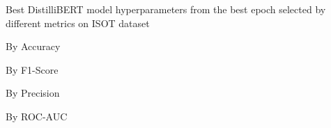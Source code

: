 \begin{table}[!htbp]
    \caption{Best DistilliBERT model hyperparameters from the best epoch selected by different metrics on ISOT dataset}
    \label{tab:isot_distillibert_hparams}
    \centering

    \begin{subtable}[t]{0.48\linewidth}
        \scriptsize
        \caption{By Accuracy}
        
    \end{subtable}
    \hfill
    \begin{subtable}[t]{0.48\linewidth}
        \scriptsize
        \caption{By F1-Score}
        
    \end{subtable}

    \vspace{1em}

    \begin{subtable}[t]{0.48\linewidth}
        \scriptsize
        \caption{By Precision}
        
    \end{subtable}
    \hfill
    \begin{subtable}[t]{0.48\linewidth}
        \scriptsize
        \caption{By ROC-AUC}
        
    \end{subtable}


\end{table}